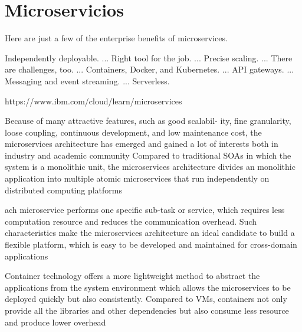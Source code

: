 \section{Microservicios}

Here are just a few of the enterprise benefits of microservices.

    Independently deployable. ...
    Right tool for the job. ...
    Precise scaling. ...
    There are challenges, too. ...
    Containers, Docker, and Kubernetes. ...
    API gateways. ...
    Messaging and event streaming. ...
    Serverless.
    
    https://www.ibm.com/cloud/learn/microservices
    
    
    
Because of many attractive features, such as good scalabil-
ity, fine granularity, loose coupling, continuous development,
and low maintenance cost, the microservices architecture has
emerged and gained a lot of interests both in industry and
academic community
Compared to traditional SOAs
in which the system is a monolithic unit, the microservices
architecture divides an monolithic application into multiple
atomic microservices that run independently on distributed
computing platforms

ach microservice performs one specific
sub-task or service, which requires less computation resource
and reduces the communication overhead. Such characteristics
make the microservices architecture an ideal candidate to
build a flexible platform, which is easy to be developed and
maintained for cross-domain applications


Container technology offers a more lightweight method to
abstract the applications from the system environment which
allows the microservices to be deployed quickly but also
consistently. Compared to VMs, containers not only provide
all the libraries and other dependencies but also consume less
resource and produce lower overhead
    